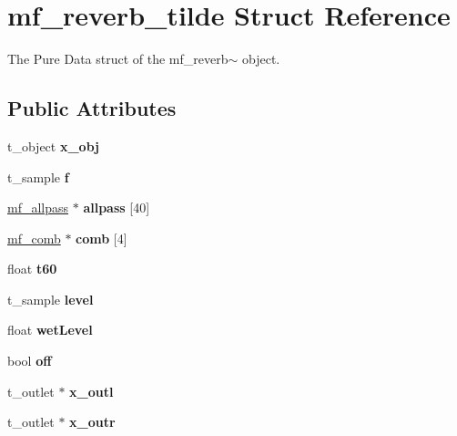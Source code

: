 \hypertarget{structmf__reverb__tilde}{}\section{mf\+\_\+reverb\+\_\+tilde Struct Reference}
\label{structmf__reverb__tilde}


The Pure Data struct of the mf\+\_\+reverb$\sim$ object. ~\newline
  


\subsection*{Public Attributes}
\begin{DoxyCompactItemize}
\item 
\mbox{\label{structmf__reverb__tilde_a23a9fce50630debf630d5c62efc89728}} 
t\+\_\+object {\bfseries x\+\_\+obj}
\item 
\mbox{\label{structmf__reverb__tilde_a59def8141c075036c1a74518d4dce107}} 
t\+\_\+sample {\bfseries f}
\item 
\mbox{\label{structmf__reverb__tilde_a9464c814fcac7c89e8b7edd0b12f1651}} 
\mbox{\hyperlink{structmf__allpass}{mf\+\_\+allpass}} $\ast$ {\bfseries allpass} \mbox{[}40\mbox{]}
\item 
\mbox{\label{structmf__reverb__tilde_a887e5e74cdc880a47774d257a8710c70}} 
\mbox{\hyperlink{structmf__comb}{mf\+\_\+comb}} $\ast$ {\bfseries comb} \mbox{[}4\mbox{]}
\item 
\mbox{\label{structmf__reverb__tilde_a37d804c62370e434a041e0fcfab5cb77}} 
float {\bfseries t60}
\item 
\mbox{\label{structmf__reverb__tilde_a1dae57844d14186ce92977bab01bab78}} 
t\+\_\+sample {\bfseries level}
\item 
\mbox{\label{structmf__reverb__tilde_ac2c4b046013eeb59dd5b13071a09580c}} 
float {\bfseries wet\+Level}
\item 
\mbox{\label{structmf__reverb__tilde_ac9346f29402393957d3db8dcd4acadc6}} 
bool {\bfseries off}
\item 
\mbox{\label{structmf__reverb__tilde_a05de17e4fc3b189a9ee0f2e87e331587}} 
t\+\_\+outlet $\ast$ {\bfseries x\+\_\+outl}
\item 
\mbox{\label{structmf__reverb__tilde_a04e694da390699470780630fc90b2065}} 
t\+\_\+outlet $\ast$ {\bfseries x\+\_\+outr}
\end{DoxyCompactItemize}

